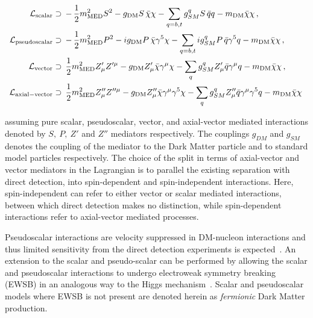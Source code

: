 \begin{align} \label{eq:LS} \mathcal{L}_{\mathrm{scalar}}&\supset\,
-\,\frac{1}{2}m_{\rm MED}^2 S^2 - g_{\rm DM}  S \, \bar{\chi}\chi - \sum_{q=b,t}
g_{SM}^q S \, \bar{q}q  - m_{\rm DM} \bar{\chi}\chi \,, \\ \label{eq:LP}
\mathcal{L}_{\rm{pseudoscalar}}&\supset\, -\,\frac{1}{2}m_{\rm MED}^2 P^2 - i
g_{\rm DM}  P \, \bar{\chi} \gamma^5\chi -\sum_{q=b,t}  i g_{SM}^q  P \, \bar{q}
\gamma^5q  - m_{\rm DM} \bar{\chi}\chi\,, \\ \label{eq:LV}
\mathcal{L}_{\mathrm{vector}}&\supset \, \frac{1}{2}m_{\rm MED}^2 Z'_{\mu}
Z'^{\mu} - g_{\rm DM}Z'_{\mu} \bar{\chi}\gamma^{\mu}\chi -\sum_q g_{SM}^q
Z'_{\mu} \bar{q}\gamma^{\mu}q - m_{\rm DM} \bar{\chi}\chi\,, \\ \label{eq:LA}
\mathcal{L}_{\rm{axial-vector}}&\supset\,  \frac{1}{2}m_{\rm MED}^2 Z''_{\mu}
Z''^{\mu} - g_{\rm DM} Z''_{\mu} \bar{\chi}\gamma^{\mu}\gamma^5\chi -\sum_q
g_{SM}^q Z''_{\mu} \bar{q}\gamma^{\mu}\gamma^5q - m_{\rm DM} \bar{\chi}\chi\,
\end{align}

assuming pure scalar, pseudoscalar, vector, and axial-vector mediated
interactions denoted by $S,~P,~Z'$ and $Z''$ mediators respectively.  The
couplings $g_{DM}$ and $g_{SM}$ denotes the coupling of the mediator to the Dark
Matter particle and to standard model particles respectively.  The choice of the
split in terms of axial-vector and vector mediators in the Lagrangian is to
parallel the existing separation with direct detection, into spin-dependent and
spin-independent interactions. Here, spin-independent can refer to either vector
or scalar mediated interactions, between which direct detection makes no
distinction, while spin-dependent interactions refer to axial-vector mediated
processes.
 
Pseudoscalar interactions are velocity suppressed in DM-nucleon interactions and
thus limited sensitivity from the direct detection experiments is
expected~\cite{Haisch:2012kf}.  An extension to the scalar and pseudo-scalar can
be performed by allowing the scalar and pseudoscalar interactions to undergo
electroweak symmetry breaking (EWSB) in an analogous way to the Higgs
mechanism~\cite{Khoze:2015sra,Hambye:2013sna,Khoze:2014xha,Khoze:2014woa,Altmannshofer:2014vra,Carone:2013wla,Heikinheimo:2013fta}.
Scalar and pseudoscalar models where EWSB is not present are denoted herein as
\emph{fermionic} Dark Matter production.

